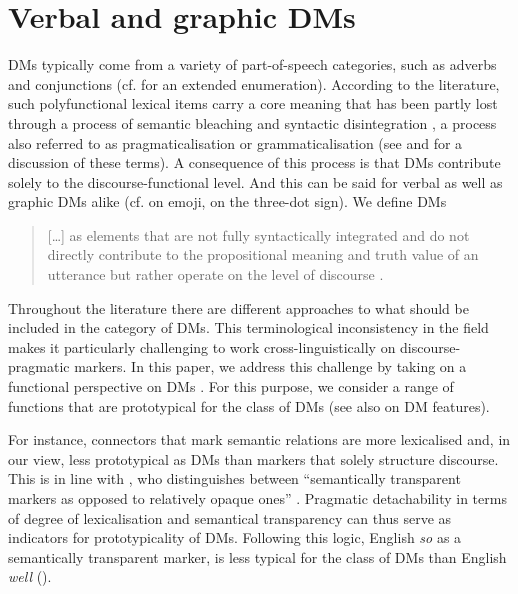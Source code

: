 \documentclass[output=paper,colorlinks,citecolor=brown]{langscibook}
\begin{document}
\section{Verbal and graphic DMs}
\label{sec:labrenzetal:Verbal_and_graphic_DMs}
DMs typically come from a variety of part-of-speech categories, such as adverbs and conjunctions (cf. \cites{schourup_discourse_1999}[69]{crible_discourse_2018} for an extended enumeration). According to the literature, such polyfunctional lexical items carry a core meaning that has been partly lost through a process of semantic bleaching and syntactic disintegration \citep[cf.][94]{hopper_grammaticalization_2003}, a process also referred to as pragmaticalisation or grammaticalisation (see \citealt{brinton_evolution_2017} and \citealt{diewald_pragmaticalization_2011} for a discussion of these terms). A consequence of this process is that DMs contribute solely to the discourse-functional level. And this can be said for verbal as well as graphic DMs alike (cf. \citealt{wiese_emoji_2021} on emoji, \citealt{labrenz_three-dot_2022} on the three-dot sign). We define DMs 
\begin{quote}
    […] as elements that are not fully syntactically integrated and do not directly contribute to the propositional meaning and truth value of an utterance but rather operate on the level of discourse \citep[cf.][]{blakemore_relevance_2004, fraser_towards_2006, bluhdorn_diskursmarker_2017}. \hfill \citep[3]{wiese_emoji_2021}
\end{quote}

\noindent Throughout the literature there are different approaches to what should be included in the category of DMs. This terminological inconsistency in the field \citep[e.g.][]{andersen_pragmatic_2001, fraser_what_1999} makes it particularly challenging to work cross-linguistically on discourse-pragmatic markers. In this paper, we address this challenge by taking on a functional perspective on DMs \citep[cf.][]{maschler_metalanguage_2009}. For this purpose, we consider a range of functions that are prototypical for the class of DMs (see also \citealt{pons_borderia_using_2021} on DM features). 

For instance, connectors that mark semantic relations are more lexicalised and, in our view, less prototypical as DMs than markers that solely structure discourse. This is in line with \citet{ariel_pragmatic_1994}, who distinguishes between “semantically transparent markers as opposed to relatively opaque ones” \citep[3251]{ariel_pragmatic_1994}. Pragmatic detachability \citep{matras_utterance_1998} in terms of degree of lexicalisation and semantical transparency can thus serve as indicators for prototypicality of DMs. Following this logic, English \textit{so} as a semantically transparent marker, is less typical for the class of DMs than English \textit{well} (\cites{ariel_pragmatic_1994}[62]{muller_discourse_2005}).
\end{document}
